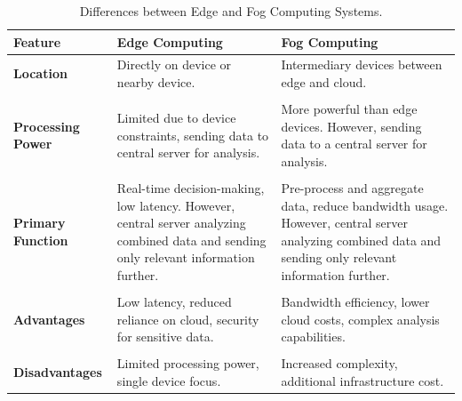 \documentclass[a4paper]{article}
\begin{document}
    \begin{table}[!htp]
        \centering
        \begin{tabular}{@{} l p{11em} p{11em} @{}}
            \toprule
            \textbf{Feature} & \textbf{Edge Computing} & \textbf{Fog Computing} \\
            \midrule
            \textbf{Location} & Directly on device or nearby device. & Intermediary devices between edge and cloud. \\
            \\
            \textbf{Processing Power} & Limited due to device constraints, sending data to central server for analysis. & More powerful than edge devices. However, sending data to a central server for analysis. \\
            \\
            \textbf{Primary Function} & Real-time decision-making, low latency. However, central server analyzing combined data and sending only relevant information further. & Pre-process and aggregate data, reduce bandwidth usage. However, central server analyzing combined data and sending only relevant information further. \\
            \\
            \textbf{Advantages} & Low latency, reduced reliance on cloud, security for sensitive data. & Bandwidth efficiency, lower cloud costs, complex analysis capabilities. \\
            \\
            \textbf{Disadvantages} & Limited processing power, single device focus. & Increased complexity, additional infrastructure cost. \\
            \bottomrule
        \end{tabular}
        \caption{Differences between Edge and Fog Computing Systems.}
    \end{table}

    \newpage

    {}
    

    \newpage

    \printindex
\end{document}
